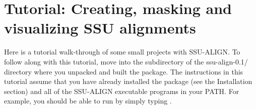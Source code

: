 \section{Tutorial: Creating, masking and visualizing SSU alignments}
\label{sec:tutorial}

Here is a tutorial walk-through of some small projects with
SSU-ALIGN. To follow along with this tutorial, move into the
 subdirectory of the {ssu-align-0.1/} directory where
you unpacked and built the package.
The instructions in this tutorial assume that you have already
installed the package (see the Installation section)
and all of the SSU-ALIGN executable programs
in your PATH. For example, you should be able to run
 by simply typing .

\begin{comment}
\subsection{Files used in this tutorial}

In the first section of this tutorial we'll use the following files in
the \prog{tutorial} directory:

  \begin{sreitems}{}
  \item[\prog{seed-15.fa}] a sequence file containing
    fifteen SSU rRNA sequences, created specifically for use in this
    tutorial. These are full or partial sequences from the archaeal,
    bacterial and eukaryotic default CRW seed alignments used to
    build the default SSU-ALIGN models.
  \end{sreitems}
\end{comment}






\newpage


\newpage


\newpage




%
%
